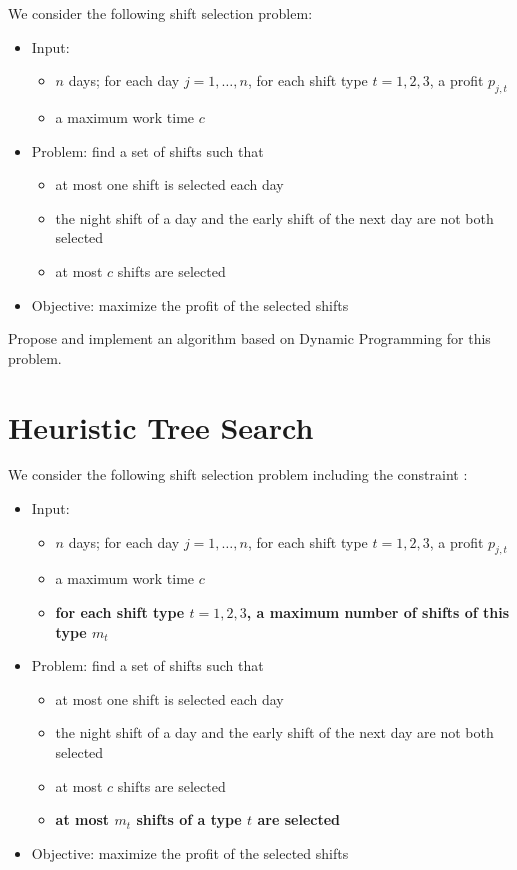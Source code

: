 \documentclass[a4paper,twocolumn]{article}
\begin{document}
We consider the following shift selection problem:
\begin{itemize}
  \item Input:
    \begin{itemize}
      \item $n$ days; for each day $j = 1, \dots, n$, for each shift type $t = 1, 2, 3$, a profit $p_{j, t}$
      \item a maximum work time $c$
    \end{itemize}
  \item Problem: find a set of shifts such that
    \begin{itemize}
      \item at most one shift is selected each day
      \item the night shift of a day and the early shift of the next day are not both selected
      \item at most $c$ shifts are selected
    \end{itemize}
  \item Objective: maximize the profit of the selected shifts
\end{itemize}

Propose and implement an algorithm based on Dynamic Programming for this problem.

\section{Heuristic Tree Search}

We consider the following shift selection problem including the constraint :
\begin{itemize}
  \item Input:
    \begin{itemize}
      \item $n$ days; for each day $j = 1, \dots, n$, for each shift type $t = 1, 2, 3$, a profit $p_{j, t}$
      \item a maximum work time $c$
      \item \textbf{for each shift type $t = 1, 2, 3$, a maximum number of shifts of this type $m_t$}
    \end{itemize}
  \item Problem: find a set of shifts such that
    \begin{itemize}
      \item at most one shift is selected each day
      \item the night shift of a day and the early shift of the next day are not both selected
      \item at most $c$ shifts are selected
      \item \textbf{at most $m_t$ shifts of a type $t$ are selected}
    \end{itemize}
  \item Objective: maximize the profit of the selected shifts
\end{itemize}
\end{document}
